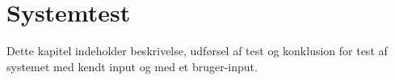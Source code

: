 \chapter{Systemtest}
Dette kapitel indeholder beskrivelse, udførsel af test og konklusion for test af systemet med kendt input og med et bruger-input. 




